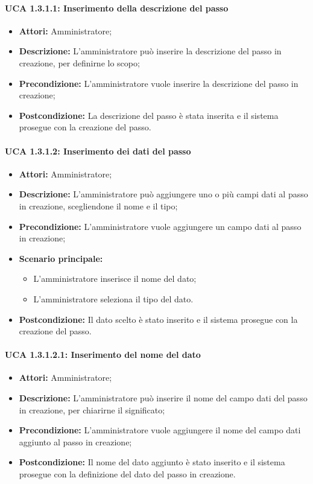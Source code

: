 \paragraph{UCA 1.3.1.1: Inserimento della descrizione del passo}
\begin{itemize}
\item \textbf{Attori:}
 Amministratore;
\item \textbf{Descrizione:} 
L'amministratore può inserire la descrizione del passo in creazione, per definirne lo scopo;
\item \textbf{Precondizione:} 
L'amministratore vuole inserire la descrizione del passo in creazione;
\item \textbf{Postcondizione:}
 La descrizione del passo è stata inserita e il sistema prosegue con la creazione del passo.
\end{itemize}

\paragraph{UCA 1.3.1.2: Inserimento dei dati del passo}
\begin{itemize}
\item \textbf{Attori:}
 Amministratore;
\item \textbf{Descrizione:} 
L'amministratore può aggiungere uno o più campi dati al passo in creazione, scegliendone il nome e il tipo;
\item \textbf{Precondizione:} 
L'amministratore vuole aggiungere un campo dati al passo in creazione;
\item \textbf{Scenario principale:} 
\begin{itemize}
\item L'amministratore inserisce il nome del dato;
\item L'amministratore seleziona il tipo del dato.
\end{itemize}
\item \textbf{Postcondizione:} 
Il dato scelto è stato inserito e il sistema prosegue con la creazione del passo.
\end{itemize}

\paragraph{UCA 1.3.1.2.1: Inserimento del nome del dato}
\begin{itemize}
\item \textbf{Attori:}
 Amministratore;
\item \textbf{Descrizione:} 
L'amministratore può inserire il nome del campo dati del passo in creazione, per chiarirne il significato;
\item \textbf{Precondizione:} 
L'amministratore vuole aggiungere il nome del campo dati aggiunto al passo in creazione;
\item \textbf{Postcondizione:} 
Il nome del dato aggiunto è stato inserito e il sistema prosegue con la definizione del dato del passo in creazione.
\end{itemize}

